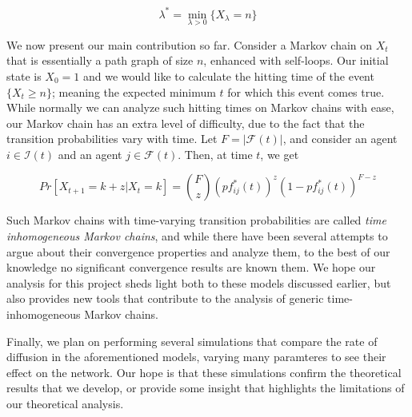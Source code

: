 \documentclass[A4paper,11pt]{article}
\begin{document}
\[
\lambda^* = \min_{\lambda > 0} { \{ X_\lambda = n \} }
\]

\par We now present our main contribution so far. Consider a Markov chain on $X_t$ that is essentially a path graph of size $n$,
enhanced with self-loops. Our initial state is $X_0 = 1$ and we would like to calculate the hitting time of the event
$\{ X_t \geq n \}$; meaning the expected minimum $t$ for which this event comes true. While normally we can analyze such
hitting times on Markov chains with ease, our Markov chain has an extra level of difficulty, due to the fact that the transition
probabilities vary with time. Let $F = |\mathcal{F}(t)|$, and consider an agent $i \in \mathcal{I}(t)$ and an agent
$j \in \mathcal{F}(t)$. Then, at time $t$, we get

\[
Pr[X_{t+1} = k + z | X_t = k] = \binom{F}{z} { \left( p f^*_{ij}(t) \right) }^z { \left( 1 - p f^*_{ij}(t) \right) }^{F-z}
\]

\par Such Markov chains with time-varying transition probabilities are called \textit{time inhomogeneous Markov chains}, and
while there have been several attempts to argue about their convergence properties and analyze them, to the best of our
knowledge no significant convergence results are known them. We hope our analysis for this project sheds light both to
these models discussed earlier, but also provides new tools that contribute to the analysis of generic time-inhomogeneous
Markov chains.

\par Finally, we plan on performing several simulations that compare the rate of diffusion in the aforementioned models,
varying many paramteres to see their effect on the network. Our hope is that these simulations confirm the theoretical
results that we develop, or provide some insight that highlights the limitations of our theoretical analysis.



%

\end{document}
